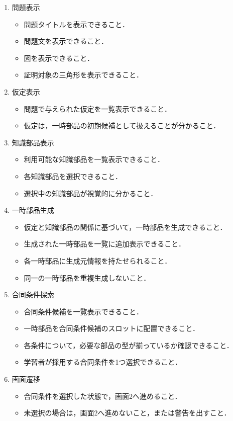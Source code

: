 \documentclass[a4paper,12pt]{ltjsarticle}
\begin{document}
\begin{enumerate}
  \item 問題表示
  \begin{itemize}
    \item 問題タイトルを表示できること．
    \item 問題文を表示できること．
    \item 図を表示できること．
    \item 証明対象の三角形を表示できること．\\
  \end{itemize}
  \item 仮定表示
  \begin{itemize}
    \item 問題で与えられた仮定を一覧表示できること．
    \item 仮定は，一時部品の初期候補として扱えることが分かること．\\
  \end{itemize}
  \item 知識部品表示
  \begin{itemize}
    \item 利用可能な知識部品を一覧表示できること．
    \item 各知識部品を選択できること．
    \item 選択中の知識部品が視覚的に分かること．\\
  \end{itemize}
  \item 一時部品生成
  \begin{itemize}
    \item 仮定と知識部品の関係に基づいて，一時部品を生成できること．
    \item 生成された一時部品を一覧に追加表示できること．
    \item 各一時部品に生成元情報を持たせられること．
    \item 同一の一時部品を重複生成しないこと．\\
  \end{itemize}
  \item 合同条件探索
  \begin{itemize}
    \item 合同条件候補を一覧表示できること．
    \item 一時部品を合同条件候補のスロットに配置できること．
    \item 各条件について，必要な部品の型が揃っているか確認できること．
    \item 学習者が採用する合同条件を1つ選択できること．\\
  \end{itemize}
  \item 画面遷移
  \begin{itemize}
    \item 合同条件を選択した状態で，画面2へ進めること．
    \item 未選択の場合は，画面2へ進めないこと，または警告を出すこと．\\
  \end{itemize}
\end{enumerate}
\newpage
\end{document}
